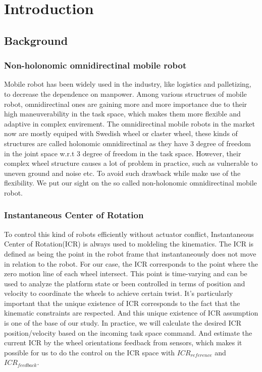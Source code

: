 \chapter{Introduction}
\label{cha:introduction}

\section{Background}
\label{sec:background}
\subsection{Non-holonomic omnidirectinal mobile robot}
Mobile robot has been widely used in the industry, like logistics and palletizing, to decrease the dependence on manpower. Among various structrues of mobile robot, omnidirectinal ones are gaining more and more 
importance due to their high maneuverability in the task space, which makes them more flexible and adaptive in complex envirement. The omnidirectinal mobile robots in the market now are mostly equiped with 
Swedish wheel or claster wheel, these kinds of structures are called holonomic omnidirectinal as they have 3 degree of freedom in the joint space w.r.t 3 degree of freedom in the task space. However, their complex 
wheel structure causes a lot of problem in practice, such as vulnerable to uneven ground and noise etc. To avoid such drawback while make use of the flexibility. We put our sight on the so called non-holonomic 
omnidirectinal mobile robot. 

\subsection{Instantaneous Center of Rotation}
\label{sec:Instantaneous Center of Rotation}
To control this kind of robots efficiently without actuator conflict, Instantaneous Center of Rotation(ICR) is always used to moldeling the kinematics. The ICR is defined as being the point in the robot frame that instantaneously does not move in relation to the robot. For our case, the ICR corresponds to the point where the zero motion line of each wheel intersect. This point is time-varying and can be used to analyze the platform state or been controlled in terms of position and velocity to coordinate the wheels to achieve certain twist. 
It's particularly important that the unique existence of ICR corresponds to the fact that the kinematic constraints are respected. And this unique existence of ICR assumption is one of the base of our study.
In practice, we will calculate the desired ICR position/velocity based on the incoming task space command. And estimate the current ICR by the wheel orientations feedback from sensors, which makes it possible for us to do the control on the ICR space with $ICR_{reference}$ and $ICR_{feedback}$. 



